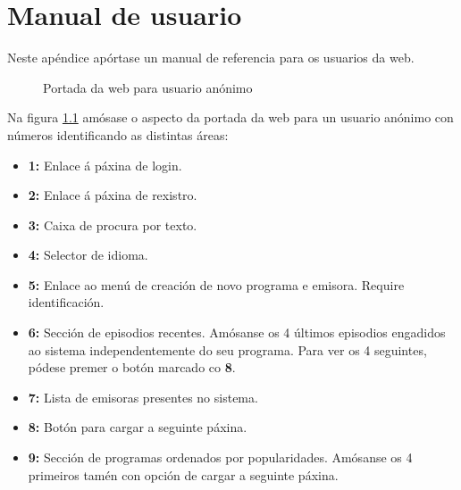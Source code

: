 \chapter[Apéndice: Manual de usuario]{
  \label{chp:usermanual}
  Manual de usuario
}

Neste apéndice apórtase un manual de referencia para os usuarios da web.

\begin{figure}[h]
	\centering
	\caption{Portada da web para usuario anónimo}
	\label{fig:um-index-anon}
\end{figure}

Na figura \ref{fig:um-index-anon} amósase o aspecto da portada da web para un usuario anónimo con números identificando as distintas áreas:

\begin{itemize}
	\item \textbf{1:} Enlace á páxina de login.
	\item \textbf{2:} Enlace á páxina de rexistro.
	\item \textbf{3:} Caixa de procura por texto.
	\item \textbf{4:} Selector de idioma.
	\item \textbf{5:} Enlace ao menú de creación de novo programa e emisora. Require identificación.
	\item \textbf{6:} Sección de episodios recentes. Amósanse os 4 últimos episodios engadidos ao sistema independentemente do seu programa. Para ver os 4 seguintes, pódese premer o botón marcado co \textbf{8}.
	\item \textbf{7:} Lista de emisoras presentes no sistema.
	\item \textbf{8:} Botón para cargar a seguinte páxina.
	\item \textbf{9:} Sección de programas ordenados por popularidades. Amósanse os 4 primeiros tamén con opción de cargar a seguinte páxina.  
\end{itemize}